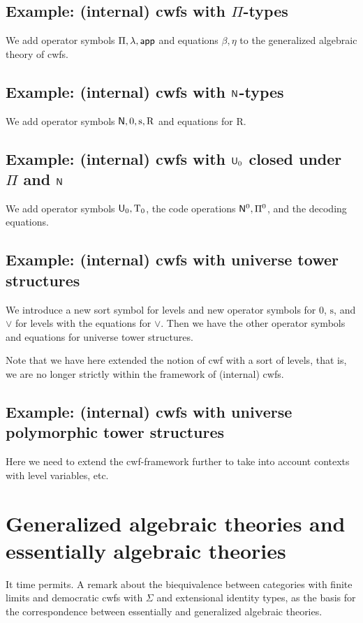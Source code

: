 \documentclass{lmcs}
\newcommand{\s}{\mathrm{s}}
\newcommand{\Rec}{\mathrm{R}}
\newcommand{\Ta}{\mathrm{T}}
\begin{document}
\subsection{Example: (internal) cwfs with $\Pi$-types} 
We add operator symbols $\Pi, \lambda, \mathsf{app}$ and equations $\beta, \eta$ to the generalized algebraic theory of cwfs. 

\subsection{Example: (internal) cwfs with $\mathsf{N}$-types} 
We add operator symbols $\N, 0, \s, \Rec$ and equations for $\Rec$.

\subsection{Example: (internal) cwfs with $\mathsf{U}_0$ closed under $\Pi$ and $\mathsf{N}$} 
We add operator symbols $\U_0, \Ta_0$, the code operations $\mathsf{N}^0, \Pi^0$, and the decoding equations.

\subsection{Example: (internal) cwfs with universe tower structures} We introduce a new sort symbol for levels and new operator symbols for 0, $\s$, and $\vee$ for levels with the equations for $\vee$. Then we have the other operator symbols and equations for universe tower structures.

Note that we have here extended the notion of cwf with a sort of levels, that is, we are no longer strictly within the framework of (internal) cwfs.

\subsection{Example: (internal) cwfs with universe polymorphic tower structures} Here we need to extend the cwf-framework further to take into account contexts with level variables, etc.

\section{Generalized algebraic theories and essentially algebraic theories}

It time permits. A remark about the biequivalence between categories with finite limits and democratic cwfs with $\Sigma$ and extensional identity types, as the basis for the correspondence between essentially and generalized algebraic theories.
\end{document}
